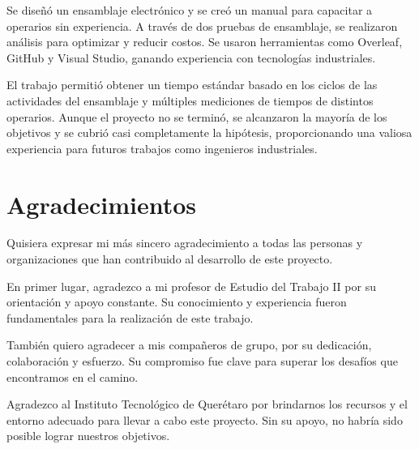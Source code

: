 Se diseñó un ensamblaje electrónico y se creó un manual para capacitar a operarios sin experiencia. A través de dos pruebas de ensamblaje, se realizaron análisis para optimizar y reducir costos. Se usaron herramientas como Overleaf, GitHub y Visual Studio, ganando experiencia con tecnologías industriales.

El trabajo permitió obtener un tiempo estándar basado en los ciclos de las actividades del ensamblaje y múltiples mediciones de tiempos de distintos operarios. Aunque el proyecto no se terminó, se alcanzaron la mayoría de los objetivos y se cubrió casi completamente la hipótesis, proporcionando una valiosa experiencia para futuros trabajos como ingenieros industriales.

    \section{Agradecimientos}
    
Quisiera expresar mi más sincero agradecimiento a todas las personas y organizaciones que han contribuido al desarrollo de este proyecto.

En primer lugar, agradezco a mi profesor de Estudio del Trabajo II por su orientación y apoyo constante. Su conocimiento y experiencia fueron fundamentales para la realización de este trabajo.

También quiero agradecer a mis compañeros de grupo, por su dedicación, colaboración y esfuerzo. Su compromiso fue clave para superar los desafíos que encontramos en el camino.

Agradezco al Instituto Tecnológico de Querétaro por brindarnos los recursos y el entorno adecuado para llevar a cabo este proyecto. Sin su apoyo, no habría sido posible lograr nuestros objetivos.

    
    
    
